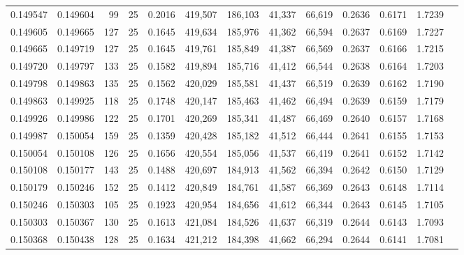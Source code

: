 \begin{tabular}{rrrrrrrrrrrrr}
0.149547 & 0.149604 &    99 &  25 &                                     0.2016 & 419,507 & 186,103 &  41,337 &  66,619 & 0.2636 & 0.6171 & 1.7239 \\
0.149605 & 0.149665 &   127 &  25 &                                     0.1645 & 419,634 & 185,976 &  41,362 &  66,594 & 0.2637 & 0.6169 & 1.7227 \\
0.149665 & 0.149719 &   127 &  25 &                                     0.1645 & 419,761 & 185,849 &  41,387 &  66,569 & 0.2637 & 0.6166 & 1.7215 \\
0.149720 & 0.149797 &   133 &  25 &                                     0.1582 & 419,894 & 185,716 &  41,412 &  66,544 & 0.2638 & 0.6164 & 1.7203 \\
0.149798 & 0.149863 &   135 &  25 &                                     0.1562 & 420,029 & 185,581 &  41,437 &  66,519 & 0.2639 & 0.6162 & 1.7190 \\
0.149863 & 0.149925 &   118 &  25 &                                     0.1748 & 420,147 & 185,463 &  41,462 &  66,494 & 0.2639 & 0.6159 & 1.7179 \\
0.149926 & 0.149986 &   122 &  25 &                                     0.1701 & 420,269 & 185,341 &  41,487 &  66,469 & 0.2640 & 0.6157 & 1.7168 \\
0.149987 & 0.150054 &   159 &  25 &                                     0.1359 & 420,428 & 185,182 &  41,512 &  66,444 & 0.2641 & 0.6155 & 1.7153 \\
0.150054 & 0.150108 &   126 &  25 &                                     0.1656 & 420,554 & 185,056 &  41,537 &  66,419 & 0.2641 & 0.6152 & 1.7142 \\
0.150108 & 0.150177 &   143 &  25 &                                     0.1488 & 420,697 & 184,913 &  41,562 &  66,394 & 0.2642 & 0.6150 & 1.7129 \\
0.150179 & 0.150246 &   152 &  25 &                                     0.1412 & 420,849 & 184,761 &  41,587 &  66,369 & 0.2643 & 0.6148 & 1.7114 \\
0.150246 & 0.150303 &   105 &  25 &                                     0.1923 & 420,954 & 184,656 &  41,612 &  66,344 & 0.2643 & 0.6145 & 1.7105 \\
0.150303 & 0.150367 &   130 &  25 &                                     0.1613 & 421,084 & 184,526 &  41,637 &  66,319 & 0.2644 & 0.6143 & 1.7093 \\
0.150368 & 0.150438 &   128 &  25 &                                     0.1634 & 421,212 & 184,398 &  41,662 &  66,294 & 0.2644 & 0.6141 & 1.7081 \\

\end{tabular}
